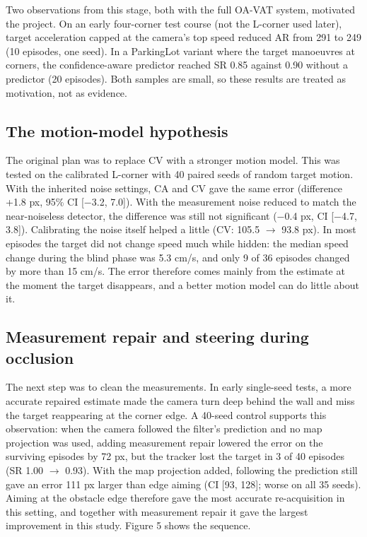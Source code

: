 \documentclass[12pt,a4paper]{article}
\begin{document}
Two observations from this stage, both with the full OA-VAT system, motivated the project. On an early four-corner test course (not the L-corner used later), target acceleration capped at the camera’s top speed reduced AR from 291 to 249 (10 episodes, one seed). In a ParkingLot variant where the target manoeuvres at corners, the confidence-aware predictor reached SR 0.85 against 0.90 without a predictor (20 episodes). Both samples are small, so these results are treated as motivation, not as evidence.

\subsection{The motion-model hypothesis}
The original plan was to replace CV with a stronger motion model. This was tested on the calibrated L-corner with 40 paired seeds of random target motion. With the inherited noise settings, CA and CV gave the same error (difference +1.8 px, 95\% CI [$-$3.2, 7.0]). With the measurement noise reduced to match the near-noiseless detector, the difference was still not significant ($-$0.4 px, CI [$-$4.7, 3.8]). Calibrating the noise itself helped a little (CV: 105.5 $\rightarrow$ 93.8 px). In most episodes the target did not change speed much while hidden: the median speed change during the blind phase was 5.3 cm/s, and only 9 of 36 episodes changed by more than 15 cm/s. The error therefore comes mainly from the estimate at the moment the target disappears, and a better motion model can do little about it.

\subsection{Measurement repair and steering during occlusion}
The next step was to clean the measurements. In early single-seed tests, a more accurate repaired estimate made the camera turn deep behind the wall and miss the target reappearing at the corner edge.
A 40-seed control supports this observation: when the camera followed the filter's prediction and no map projection was used, adding measurement repair lowered the error on the surviving episodes by 72 px, but the tracker lost the target in 3 of 40 episodes (SR 1.00 $\rightarrow$ 0.93).
With the map projection added, following the prediction still gave an error 111 px larger than edge aiming (CI [93, 128]; worse on all 35 seeds).
Aiming at the obstacle edge therefore gave the most accurate re-acquisition in this setting, and together with measurement repair it gave the largest improvement in this study. Figure 5 shows the sequence.
\end{document}
